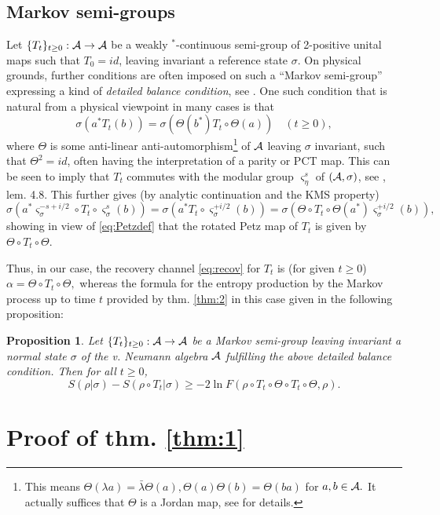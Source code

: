 \documentclass[english,a4paper,12pt]{article}
\newtheorem{proposition}{Proposition}
\def\cA{{\mathfrak A}}
\newcommand{\ca}[1]{{\cal #1}}
\newcommand{\ben}{\begin{equation}}
\newcommand{\een}{\end{equation}}
\def\cA{{\ca A}}
\renewcommand{\log}{\operatorname{ln}}
\begin{document}
\subsection{Markov semi-groups}

Let $\{T_t\}_{t\ge 0}: \cA \to \cA$ be a weakly $^*$-continuous semi-group of 2-positive unital maps such that $T_0=id$, leaving invariant a reference state $\sigma$.  On physical 
grounds, further conditions are often imposed on such a ``Markov semi-group'' expressing a kind of {\it detailed balance 
condition}, see \cite{Koss,Maj1,Maj2}. One such condition that is natural from a physical viewpoint in many cases is that 
 \ben
 \sigma(a^* T_t(b))= \sigma(\Theta(b^*)T_t \circ \Theta(a))\quad (t \ge 0),
 \een 
where $\Theta$ is some anti-linear anti-automorphism\footnote{This means $\Theta(\lambda a)=\bar \lambda \Theta(a), 
\Theta(a)\Theta(b)=\Theta(ba)$ for $a,b \in \cA.$ It actually suffices that $\Theta$ is a Jordan map, see 
\cite{Maj} for details.} of $\cA$ leaving $\sigma$ invariant, 
such that $\Theta^2 = id$, often having the interpretation 
of a parity or PCT map. This can be seen to imply that $T_t$ commutes with the modular group $\varsigma^s_\eta$ of $(\cA,\sigma)$, 
see \cite{Maj}, lem. 4.8. This further gives (by analytic continuation and the KMS property)
\ben
\sigma(a^* \varsigma_\sigma^{-s+i/2} \circ T_t \circ \varsigma_\sigma^s (b)) = 
\sigma(a^*T_t \circ \varsigma_\sigma^{+i/2} (b)) = \sigma(\Theta \circ T_t \circ \Theta(a^*) \varsigma_\sigma^{+i/2} (b)), 
\een
showing in view of \eqref{eq:Petzdef} that the rotated Petz map of $T_t$ is given by $\Theta \circ T_t \circ \Theta$. 

Thus, in our case,  the recovery channel \eqref{eq:recov} for $T_t$ is (for given $t \ge 0$)
$
\alpha = \Theta \circ T_t \circ \Theta , 
$
whereas the formula for the entropy production by the Markov process up to time $t$ 
provided by thm. \ref{thm:2} in this case given in the following 
proposition:
\begin{proposition}
Let $\{T_t\}_{t\ge 0}: \cA \to \cA$ be a Markov semi-group leaving invariant a normal state $\sigma$ of the v. Neumann algebra $\cA$
fulfilling the above detailed balance condition.
Then for all $t \ge 0$,  
\ben
S(\rho | \sigma) - S(\rho \circ T_t | \sigma) \ge -2 \log F(\rho \circ T_{t} \circ \Theta \circ T_t \circ \Theta, \rho).
\een
\end{proposition}

\section{Proof of thm. \ref{thm:1}}\label{sec:5}
\end{document}
